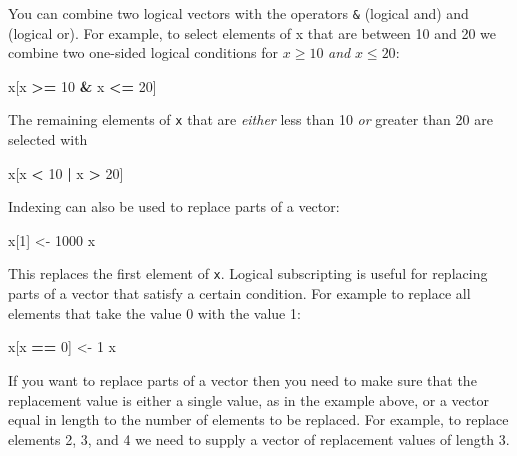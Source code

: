 \documentclass[
]{book}
\newenvironment{Shaded}{\begin{snugshade}}{\end{snugshade}}
\newcommand{\DecValTok}[1]{\textcolor[rgb]{0.00,0.00,0.81}{#1}}
\newcommand{\NormalTok}[1]{#1}
\newcommand{\OtherTok}[1]{\textcolor[rgb]{0.56,0.35,0.01}{#1}}
\newcommand{\SpecialCharTok}[1]{\textcolor[rgb]{0.81,0.36,0.00}{\textbf{#1}}}
\begin{document}
You can combine two logical vectors with the operators \texttt{\&}
(logical and) and \texttt{\textbar{}} (logical or). For example, to select
elements of x that are between 10 and 20 we combine two one-sided logical
conditions for \(x \geq 10\) \emph{and} \(x \leq 20\):

\begin{Shaded}
\begin{Highlighting}[]
\NormalTok{x[x }\SpecialCharTok{\textgreater{}=} \DecValTok{10} \SpecialCharTok{\&}\NormalTok{ x }\SpecialCharTok{\textless{}=} \DecValTok{20}\NormalTok{]}
\end{Highlighting}
\end{Shaded}

The remaining elements of \texttt{x} that are \emph{either} less than 10
\emph{or} greater than 20 are selected with

\begin{Shaded}
\begin{Highlighting}[]
\NormalTok{x[x }\SpecialCharTok{\textless{}} \DecValTok{10} \SpecialCharTok{|}\NormalTok{ x }\SpecialCharTok{\textgreater{}} \DecValTok{20}\NormalTok{]}
\end{Highlighting}
\end{Shaded}

Indexing can also be used to replace parts of a vector:

\begin{Shaded}
\begin{Highlighting}[]
\NormalTok{x[}\DecValTok{1}\NormalTok{] }\OtherTok{\textless{}{-}} \DecValTok{1000}
\NormalTok{x}
\end{Highlighting}
\end{Shaded}

This replaces the first element of \texttt{x}. Logical subscripting is
useful for replacing parts of a vector that satisfy a certain condition.
For example to replace all elements that take the value 0 with the value 1:

\begin{Shaded}
\begin{Highlighting}[]
\NormalTok{x[x }\SpecialCharTok{==} \DecValTok{0}\NormalTok{] }\OtherTok{\textless{}{-}} \DecValTok{1}
\NormalTok{x}
\end{Highlighting}
\end{Shaded}

If you want to replace parts of a vector then you need to make sure
that the replacement value is either a single value, as in the example
above, or a vector equal in length to the number of elements to be
replaced. For example, to replace elements 2, 3, and 4 we need to
supply a vector of replacement values of length 3.
\end{document}
